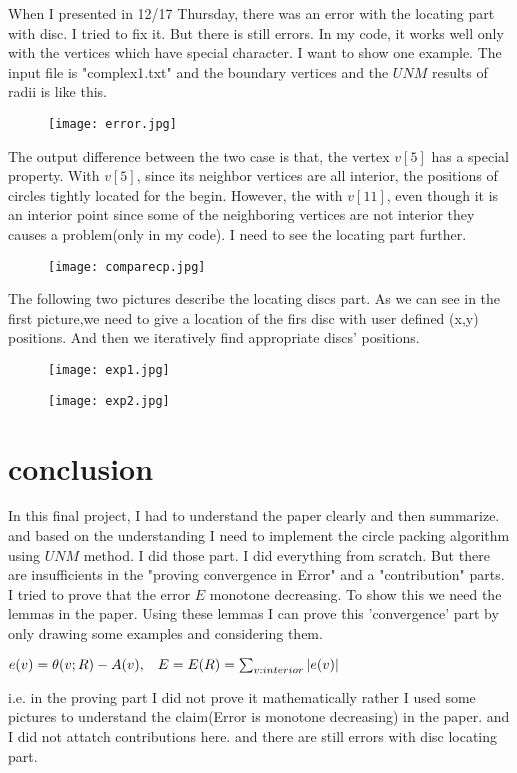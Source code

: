 \documentclass{SOP_KimMoran}
\begin{document}
When I presented in 12/17 Thursday, there was an error with the locating part with disc. I tried to fix it. But there is still errors. In my code, it works well only with the vertices which have special character. I want to show one example. The input file is "complex1.txt" and the boundary vertices and the $UNM$ results of radii is like this.
\begin{figure}[H]
  \texttt{[image: error.jpg]}
\end{figure}
The output difference between the two case is that, the vertex $v[5]$ has a special property. With $v[5]$, since its neighbor vertices are all interior, the positions of circles tightly located for the begin. However, the with $v[11]$, even though it
is an interior point since some of the neighboring vertices are not interior they causes a problem(only in my code). I need to see the locating part further.
\begin{figure}[H]
  \texttt{[image: comparecp.jpg]}
\end{figure}
The following two pictures describe the locating discs part. As we can see in the first picture,we need to give a location of the firs disc with user defined (x,y) positions. And then we iteratively find appropriate discs' positions. 
\begin{figure}[H]
  \texttt{[image: exp1.jpg]}
\end{figure}
\begin{figure}[H]
  \texttt{[image: exp2.jpg]}
\end{figure}

\section{conclusion}
In this final project, I had to understand the paper clearly and then summarize. and based on the understanding I need to implement the circle packing algorithm using $UNM$ method. I did those part. I did everything from scratch.  But there are insufficients in the "proving convergence in Error" and a "contribution" parts. I tried to prove that the error $E$ monotone decreasing. To show this we need the lemmas in the paper. Using these lemmas I can prove this 'convergence' part by only drawing some examples and considering them.\\
\centerline{$e(v)=\theta(v;R)-A(v), \hspace{0.3cm}E=E(R)=\sum_{v:interior}|e(v)|$}
i.e. in the proving part I did not prove it mathematically rather I used some pictures to understand the claim(Error is monotone decreasing) in the paper. and I did not attatch contributions here. and there are still errors with disc locating part.  
\end{document}
